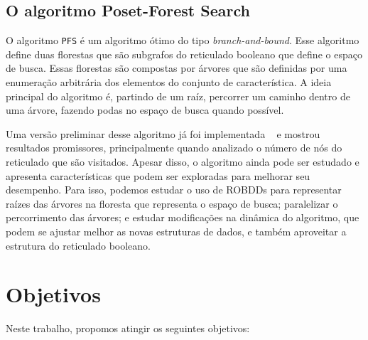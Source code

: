 \documentclass[12pt]{article}
\begin{document}
\subsection{O algoritmo Poset-Forest Search}
O algoritmo {\tt PFS} é um algoritmo ótimo do tipo 
{\em branch-and-bound}. Esse algoritmo define duas florestas que são 
subgrafos do reticulado booleano que define o espaço de busca. Essas
florestas são compostas por árvores que são definidas por uma enumeração
arbitrária dos elementos do conjunto de característica. A ideia 
principal do algoritmo é, partindo de um raíz, percorrer um caminho 
dentro de uma árvore, fazendo podas no espaço de busca quando possível.

Uma versão preliminar desse algoritmo já foi implementada 
~\cite{msreis thesis} e mostrou resultados promissores, principalmente
quando analizado o número de nós do reticulado que são visitados. Apesar
disso, o algoritmo ainda pode ser estudado e apresenta características
que podem ser exploradas para melhorar seu desempenho. Para isso, 
podemos estudar o uso de ROBDDs para representar raízes das árvores na
floresta que representa o espaço de busca; paralelizar o percorrimento 
das árvores; e estudar modificações na dinâmica do algoritmo, que podem
se ajustar melhor as novas estruturas de dados, e também aproveitar
a estrutura do reticulado booleano.


\section{Objetivos}
Neste trabalho, propomos atingir os seguintes objetivos:
\end{document}
